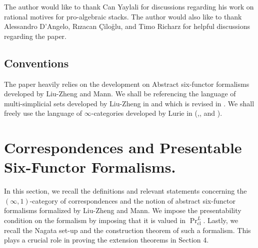 \documentclass[14pt]{article}
\theoremstyle{definition}
\newcommand{\op}[1]{\operatorname{#1}}
\numberwithin{subsection}{section}
\begin{document}
The author would like to thank Can Yaylali for discussions regarding his work on rational motives for pro-algebraic stacks. The author would  also like to thank Alessandro D'Angelo, R{\i}zacan \c{C}ilo\u{g}lu, and Timo Richarz for helpful discussions regarding the paper. 

\subsection*{Conventions}

The paper heavily relies on the development on Abstract six-functor formalisms developed by Liu-Zheng and Mann. We shall be  referencing the language of multi-simplicial sets developed by Liu-Zheng in \cite[Section 1.3]{liu2017enhanced} and which is revised in \cite[Section 2]{chowdhury2025sixfunctorformalismsii}. We shall freely use the language of $\infty$-categories developed by Lurie in (\cite{HTT},\cite{HA},\cite{kerodon} and \cite{SAG}).



\section{Correspondences and Presentable Six-Functor Formalisms.}

In this section, we recall the definitions and relevant statements concerning the $(\infty,1)$-category of correspondences and the notion of abstract six-functor formalisms formalized by Liu-Zheng and Mann. We impose the presentability condition on the formalism by imposing that it is valued in $\op{Pr}^L_{\op{cl}}$. Lastly, we recall the Nagata set-up and the construction theorem of such a formalism. This plays a crucial role in proving the extension theorems in Section 4.  
\end{document}
